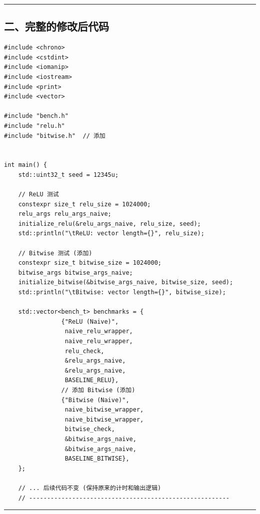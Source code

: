 \documentclass[11pt, a4paper]{article}
\begin{document}
\begin{aibox}
\begin{itemize}
\end{itemize}

\begin{center}\rule{\textwidth}{0.4pt}\end{center}

\subsection*{二、完整的修改后代码}

\begin{tcolorbox}[colback=white,colframe=gray!50!white,boxrule=0.5pt,arc=2pt,left=5pt,right=5pt,top=5pt,bottom=5pt]
\begin{verbatim}
#include <chrono>
#include <cstdint>
#include <iomanip>
#include <iostream>
#include <print>
#include <vector>

#include "bench.h"
#include "relu.h"
#include "bitwise.h"  // 添加


int main() {
    std::uint32_t seed = 12345u;
    
    // ReLU 测试
    constexpr size_t relu_size = 1024000;
    relu_args relu_args_naive;
    initialize_relu(&relu_args_naive, relu_size, seed);
    std::println("\tReLU: vector length={}", relu_size);
    
    // Bitwise 测试 (添加)
    constexpr size_t bitwise_size = 1024000;
    bitwise_args bitwise_args_naive;
    initialize_bitwise(&bitwise_args_naive, bitwise_size, seed);
    std::println("\tBitwise: vector length={}", bitwise_size);

    std::vector<bench_t> benchmarks = {
                {"ReLU (Naive)",
                 naive_relu_wrapper,
                 naive_relu_wrapper,
                 relu_check,
                 &relu_args_naive,
                 &relu_args_naive,
                 BASELINE_RELU},
                // 添加 Bitwise (添加)
                {"Bitwise (Naive)",
                 naive_bitwise_wrapper,
                 naive_bitwise_wrapper,
                 bitwise_check,
                 &bitwise_args_naive,
                 &bitwise_args_naive,
                 BASELINE_BITWISE},
    };
    
    // ... 后续代码不变 (保持原来的计时和输出逻辑)
    // --------------------------------------------------------
\end{verbatim}
\end{tcolorbox}

\begin{center}\rule{\textwidth}{0.4pt}\end{center}


\end{aibox}
\end{document}
